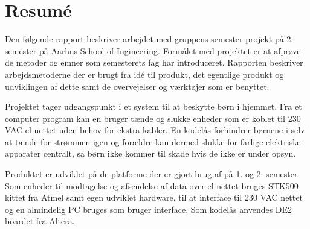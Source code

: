 \chapter*{Resumé}

Den følgende rapport beskriver arbejdet med gruppens semester-projekt på 2. semester på Aarhus School of Ingineering. Formålet med projektet er at afprøve de metoder og emner som semesterets fag har introduceret. Rapporten beskriver arbejdsmetoderne der er brugt fra idé til produkt, det egentlige produkt og udviklingen af dette samt de overvejelser og værktøjer som er benyttet.

Projektet tager udgangspunkt i et system til at beskytte børn i hjemmet. Fra et computer program kan en bruger tænde og slukke enheder som er koblet til 230 VAC el-nettet uden behov for ekstra kabler. En kodelås forhindrer børnene i selv at tænde for strømmen igen og forældre kan dermed slukke for farlige elektriske apparater centralt, så børn ikke kommer til skade hvis de ikke er under opsyn. 

Produktet er udviklet på de platforme der er gjort brug af på 1. og 2. semester. Som enheder til modtagelse og afsendelse af data over el-nettet bruges STK500 kittet fra Atmel samt egen udviklet hardware, til at interface til 230 VAC nettet og en almindelig PC bruges som bruger interface. Som kodelås anvendes DE2 boardet fra Altera.

